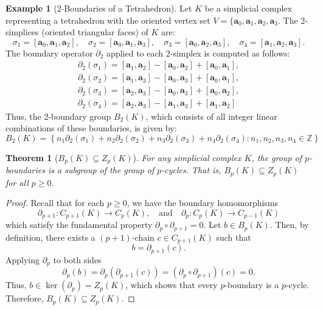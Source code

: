 \documentclass[12pt,oneside,reqno]{amsart}
\theoremstyle{plain}
\newtheorem{theorem}{Theorem}[section]
\theoremstyle{definition}
\newtheorem{example}{Example}[section]
\theoremstyle{remark}
\newcommand{\0}{{\textbf{0}}}
\begin{document}
\begin{example}[2-Boundaries of a Tetrahedron]
Let $K$ be a simplicial complex representing a tetrahedron with the oriented vertex set $V = \{\bm{a}_0, \bm{a}_1, \bm{a}_2, \bm{a}_3$. The 2-simplices (oriented triangular faces) of $K$ are:
\[
\sigma_1 = [\bm{a}_0, \bm{a}_1, \bm{a}_2], \quad
\sigma_2 = [\bm{a}_0, \bm{a}_1, \bm{a}_3], \quad
\sigma_3 = [\bm{a}_0, \bm{a}_2, \bm{a}_3], \quad
\sigma_4 = [\bm{a}_1, \bm{a}_2, \bm{a}_3].
\]
The boundary operator $\partial_2$ applied to each 2-simplex is computed as follows:
\begin{gather*}
\partial_2(\sigma_1) = [\bm{a}_1, \bm{a}_2] - [\bm{a}_0, \bm{a}_2] + [\bm{a}_0, \bm{a}_1],\\
\partial_2(\sigma_2) = [\bm{a}_1, \bm{a}_3] - [\bm{a}_0, \bm{a}_3] + [\bm{a}_0, \bm{a}_1],\\
\partial_2(\sigma_3) = [\bm{a}_2, \bm{a}_3] - [\bm{a}_0, \bm{a}_3] + [\bm{a}_0, \bm{a}_2],\\
\partial_2(\sigma_4) = [\bm{a}_2, \bm{a}_3] - [\bm{a}_1, \bm{a}_3] + [\bm{a}_1, \bm{a}_2]
\end{gather*}
Thus, the 2-boundary group $B_2(K)$, which consists of all integer linear combinations of these boundaries, is given by:
\[
B_2(K) = \left\{
n_1 \partial_2(\sigma_1) + n_2 \partial_2(\sigma_2) + n_3 \partial_2(\sigma_3) + n_4 \partial_2(\sigma_4)
\colon n_1, n_2, n_3, n_4 \in \mathbb{Z}
\right\}
\]
\end{example}

\begin{theorem}[$B_p(K) \subseteq Z_p(K)$]\label{t:Group of p boundaries is a subgroup of the group of p cycles}
For any simplicial complex $K$, the group of $p$-boundaries is a subgroup of the group of $p$-cycles. That is, $B_p(K) \subseteq Z_p(K)$ for all $p \geq 0$.
\end{theorem}

\begin{proof}
Recall that for each $p \geq 0$, we have the boundary homomorphisms
\[
\partial_{p+1} \colon C_{p+1}(K) \to C_p(K), \quad \text{and} \quad
\partial_p \colon C_p(K) \to C_{p-1}(K)
\]
which satisfy the fundamental property $\partial_p \circ \partial_{p+1} = 0$. Let $b \in B_p(K)$. Then, by definition, there exists a $(p+1)$-chain $c \in C_{p+1}(K)$ such that
\[
b = \partial_{p+1}(c).
\]
Applying $\partial_p$ to both sides
\[
\partial_p(b) = \partial_p(\partial_{p+1}(c)) = (\partial_p \circ \partial_{p+1})(c) = 0.
\]
Thus, $b \in \ker(\partial_p) = Z_p(K)$, which shows that every $p$-boundary is a $p$-cycle. Therefore, $B_p(K) \subseteq Z_p(K)$.
\end{proof}
\end{document}
